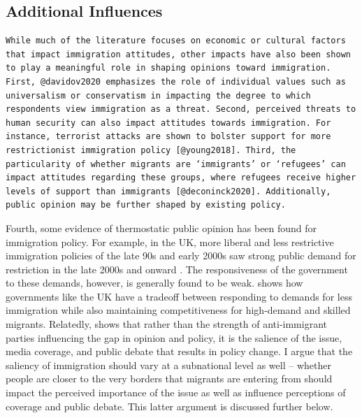 \documentclass[12pt,]{article}
\begin{document}
\subsection{Additional Influences}\label{additional-influences}

\begin{verbatim}
While much of the literature focuses on economic or cultural factors that impact immigration attitudes, other impacts have also been shown to play a meaningful role in shaping opinions toward immigration. First, @davidov2020 emphasizes the role of individual values such as universalism or conservatism in impacting the degree to which respondents view immigration as a threat. Second, perceived threats to human security can also impact attitudes towards immigration. For instance, terrorist attacks are shown to bolster support for more restrictionist immigration policy [@young2018]. Third, the particularity of whether migrants are ‘immigrants’ or ‘refugees’ can impact attitudes regarding these groups, where refugees receive higher levels of support than immigrants [@deconinck2020]. Additionally, public opinion may be further shaped by existing policy.
\end{verbatim}

Fourth, some evidence of thermostatic public opinion has been found for
immigration policy. For example, in the UK, more liberal and less
restrictive immigration policies of the late 90s and early 2000s saw
strong public demand for restriction in the late 2000s and onward
\citep{ford2015}. The responsiveness of the government to these demands,
however, is generally found to be weak. \citet{ford2015} shows how
governments like the UK have a tradeoff between responding to demands
for less immigration while also maintaining competitiveness for
high-demand and skilled migrants. Relatedly, \citet{morales2015} shows
that rather than the strength of anti-immigrant parties influencing the
gap in opinion and policy, it is the salience of the issue, media
coverage, and public debate that results in policy change. I argue that
the saliency of immigration should vary at a subnational level as well
-- whether people are closer to the very borders that migrants are
entering from should impact the perceived importance of the issue as
well as influence perceptions of coverage and public debate. This latter
argument is discussed further below.
\end{document}
